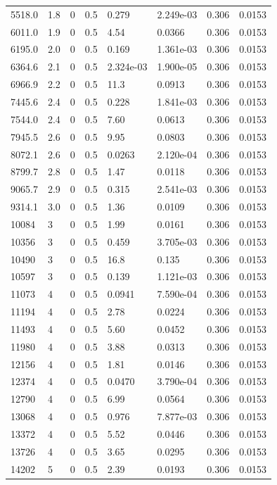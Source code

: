 \documentclass[preview]{standalone}
\begin{document}
{{\begin{tabular}{L{1.2cm}C{1.2cm} C{0.3cm}C{0.5cm} C{1.4cm}C{1.4cm} C{1.4cm}C{1.4cm}}
  5518.0  &   1.8  & 0     & 0.5 &  0.279  & 2.249e-03  & 0.306 &  0.0153   \\ 
  6011.0  &   1.9  & 0     & 0.5 &  4.54  & 0.0366  & 0.306 &  0.0153   \\ 
  6195.0  &   2.0  & 0     & 0.5 &  0.169  & 1.361e-03  & 0.306 &  0.0153   \\ 
  6364.6  &   2.1  & 0     & 0.5 &  2.324e-03  & 1.900e-05  & 0.306 &  0.0153   \\ 
  6966.9  &   2.2  & 0     & 0.5 &  11.3  & 0.0913  & 0.306 &  0.0153   \\ 
  7445.6  &   2.4  & 0     & 0.5 &  0.228  & 1.841e-03  & 0.306 &  0.0153   \\ 
  7544.0  &   2.4  & 0     & 0.5 &  7.60  & 0.0613  & 0.306 &  0.0153   \\ 
  7945.5  &   2.6  & 0     & 0.5 &  9.95  & 0.0803  & 0.306 &  0.0153   \\ 
  8072.1  &   2.6  & 0     & 0.5 &  0.0263  & 2.120e-04  & 0.306 &  0.0153   \\ 
  8799.7  &   2.8  & 0     & 0.5 &  1.47  & 0.0118  & 0.306 &  0.0153   \\ 
  9065.7  &   2.9  & 0     & 0.5 &  0.315  & 2.541e-03  & 0.306 &  0.0153   \\ 
  9314.1  &   3.0  & 0     & 0.5 &  1.36  & 0.0109  & 0.306 &  0.0153   \\ 
  10084  &     3  & 0     & 0.5 &  1.99  & 0.0161  & 0.306 &  0.0153   \\ 
  10356  &     3  & 0     & 0.5 &  0.459  & 3.705e-03  & 0.306 &  0.0153   \\ 
  10490  &     3  & 0     & 0.5 &  16.8  & 0.135  & 0.306 &  0.0153   \\ 
  10597  &     3  & 0     & 0.5 &  0.139  & 1.121e-03  & 0.306 &  0.0153   \\ 
  11073  &     4  & 0     & 0.5 &  0.0941  & 7.590e-04  & 0.306 &  0.0153   \\ 
  11194  &     4  & 0     & 0.5 &  2.78  & 0.0224  & 0.306 &  0.0153   \\ 
  11493  &     4  & 0     & 0.5 &  5.60  & 0.0452  & 0.306 &  0.0153   \\ 
  11980  &     4  & 0     & 0.5 &  3.88  & 0.0313  & 0.306 &  0.0153   \\ 
  12156  &     4  & 0     & 0.5 &  1.81  & 0.0146  & 0.306 &  0.0153   \\ 
  12374  &     4  & 0     & 0.5 &  0.0470  & 3.790e-04  & 0.306 &  0.0153   \\ 
  12790  &     4  & 0     & 0.5 &  6.99  & 0.0564  & 0.306 &  0.0153   \\ 
  13068  &     4  & 0     & 0.5 &  0.976  & 7.877e-03  & 0.306 &  0.0153   \\ 
  13372  &     4  & 0     & 0.5 &  5.52  & 0.0446  & 0.306 &  0.0153   \\ 
  13726  &     4  & 0     & 0.5 &  3.65  & 0.0295  & 0.306 &  0.0153   \\ 
  14202  &     5  & 0     & 0.5 &  2.39  & 0.0193  & 0.306 &  0.0153   \\ 
\hline 
\end{tabular} 

}}
\end{document}
